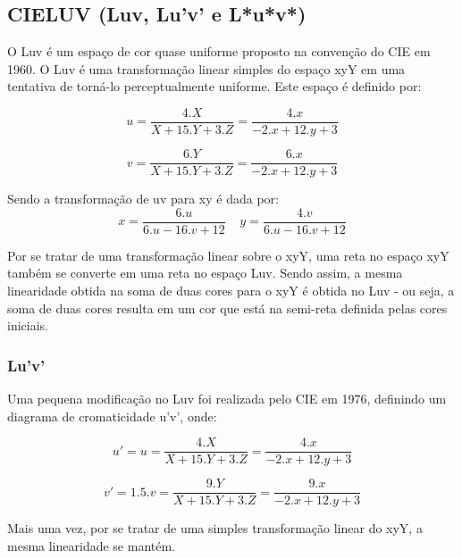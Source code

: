 \documentclass[a4paper,10pt]{report}
\begin{document}
\subsection{CIELUV (Luv, Lu'v' e L*u*v*)}
\par
O Luv é um espaço de cor quase uniforme proposto na convenção do CIE em 1960.
O Luv é uma transformação linear simples do espaço xyY em uma tentativa de
torná-lo perceptualmente uniforme. Este espaço é definido por:

\begin{equation}\label{eq:Luv_u}
u=\frac{4.X}{X+15.Y+3.Z}=\frac{4.x}{-2.x+12.y+3}
\end{equation}

\begin{equation}\label{eq:Luv_v}
v=\frac{6.Y}{X+15.Y+3.Z}=\frac{6.x}{-2.x+12.y+3}
\end{equation}

\par
Sendo a transformação de uv para xy é dada por:
\begin{equation}\label{eq:Luv_xy}
x=\frac{6.u}{6.u-16.v+12}\;\;\;\; y=\frac{4.v}{6.u-16.v+12}
\end{equation}

\par
Por se tratar de uma transformação linear sobre o xyY, uma reta no espaço xyY 
também se converte em uma reta no espaço Luv. Sendo assim, a mesma linearidade
obtida na soma de duas cores para o xyY é obtida no Luv - ou seja, a soma de
duas cores resulta em um cor que está na semi-reta definida pelas cores
iniciais.

\subsubsection{Lu'v'}
\par
Uma pequena modificação no Luv foi realizada pelo CIE em 1976, definindo um
diagrama de cromaticidade u'v', onde: 

\begin{equation}\label{eq:Lu'v'_u'}
u'=u=\frac{4.X}{X+15.Y+3.Z}=\frac{4.x}{-2.x+12.y+3}
\end{equation}

\begin{equation}\label{eq:Lu'v'_v'}
v'=1.5.v=\frac{9.Y}{X+15.Y+3.Z}=\frac{9.x}{-2.x+12.y+3}
\end{equation}

\par
Mais uma vez, por se tratar de uma simples transformação linear do xyY, a mesma
linearidade se mantém.
\end{document}
